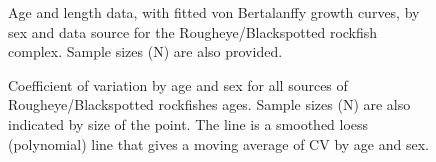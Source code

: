 \documentclass[
]{scrartcl}
\begin{document}
\begin{figure}


\caption{\label{fig-AL_1}Age and length data, with fitted von
Bertalanffy growth curves, by sex and data source for the
Rougheye/Blackspotted rockfish complex. Sample sizes (N) are also
provided.}

\end{figure}%

\begin{figure}


\caption{\label{fig-AL_2}Coefficient of variation by age and sex for all
sources of Rougheye/Blackspotted rockfishes ages. Sample sizes (N) are
also indicated by size of the point. The line is a smoothed loess
(polynomial) line that gives a moving average of CV by age and sex.}

\end{figure}%
\end{document}

